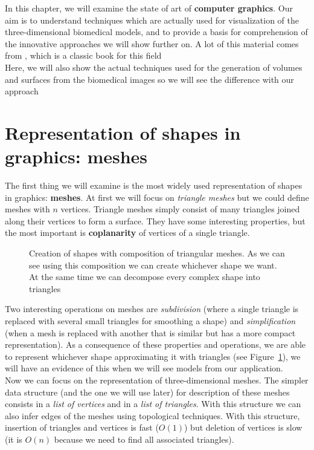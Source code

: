 In this chapter, we will examine the state of art of \textbf{computer graphics}. Our aim is to understand techniques which are actually used for visualization of the three-dimensional biomedical models, and to provide a basis for comprehension of the innovative approaches we will show further on. A lot of this material comes from \cite{Hughes}, which is a classic book for this field\\

Here, we will also show the actual techniques used for the generation of volumes and surfaces from the biomedical images so we will see the difference with our approach 

\section{Representation of shapes in graphics: meshes}\label{sec14:mesh}

The first thing we will examine is the most widely used representation of shapes in graphics: \textbf{meshes}. At first we will focus on \textit{triangle meshes} but we could define meshes with $n$ vertices. Triangle meshes simply consist of many triangles joined along their vertices to form a surface. They have some interesting properties, but the most important is \textbf{coplanarity} of vertices of a single triangle.

\begin{figure}[htb] %
   \centering
   
   \caption[Examples of triangular meshes]{Creation of shapes with composition of triangular meshes. As we can see using this composition we can create whichever shape we want. At the same time we can decompose every complex shape into triangles}
   \label{fig:triangularMeshes}
\end{figure}

Two interesting operations on meshes are \textit{subdivision} (where a single triangle is replaced with several small triangles for smoothing a shape) and \textit{simplification} (when a mesh is replaced with another that is similar but has a more compact representation). As a consequence of these properties and operations, we are able to represent whichever shape approximating it with triangles (see Figure~\ref{fig:triangularMeshes}), we will have an evidence of this when we will see models from our application.\\

Now we can focus on the representation of three-dimensional meshes. The simpler data structure (and the one we will use later) for description of these meshes consists in a \textit{list of vertices} and in a \textit{list of triangles}. With this structure we can also infer edges of the meshes using topological techniques. With this structure, insertion of triangles and vertices is fast ($O(1)$) but deletion of vertices is slow (it is $O(n)$ because we need to find all associated triangles).

